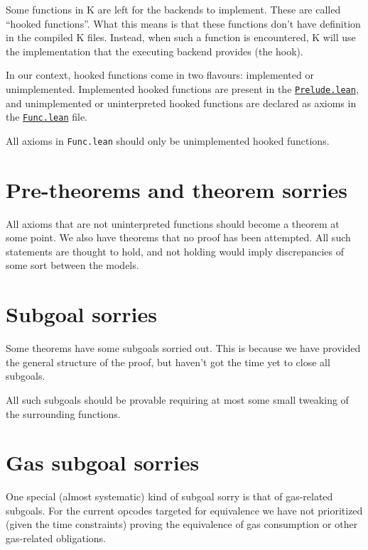 Some functions in K are left for the backends to implement. These are called
``hooked functions''. What this means is that these functions don't have
definition in the compiled K files. Instead, when such a function is
encountered, K will use the implementation that the executing backend provides
(the hook).

In our context, hooked functions come in two flavours: implemented or
unimplemented. Implemented hooked functions are present in the
\href{https://runtimeverification.github.io/evm-equivalence/docs/EvmEquivalence/KEVM2Lean/Prelude.html}{\texttt{Prelude.lean}},
and unimplemented or uninterpreted hooked functions are declared as axioms in
the
\href{https://runtimeverification.github.io/evm-equivalence/docs/EvmEquivalence/KEVM2Lean/Func.html}{\texttt{Func.lean}}
file.

All axioms in \texttt{Func.lean} should only be unimplemented hooked functions.

\section{Pre-theorems and theorem sorries}

All axioms that are not uninterpreted functions should become a theorem at some
point. We also have theorems that no proof has been attempted. All such
statements are thought to hold, and not holding would imply discrepancies of
some sort between the models.

\section{Subgoal sorries}

Some theorems have some subgoals sorried out. This is because we have
provided the general structure of the proof, but haven't got the time yet to
close all subgoals.

All such subgoals should be provable requiring at most some small tweaking of
the surrounding functions.

\section{Gas subgoal sorries}

One special (almost systematic) kind of subgoal sorry is that of gas-related subgoals.
For the current opcodes targeted for equivalence we have not prioritized (given the time constraints) proving the equivalence of gas consumption or other gas-related obligations.

